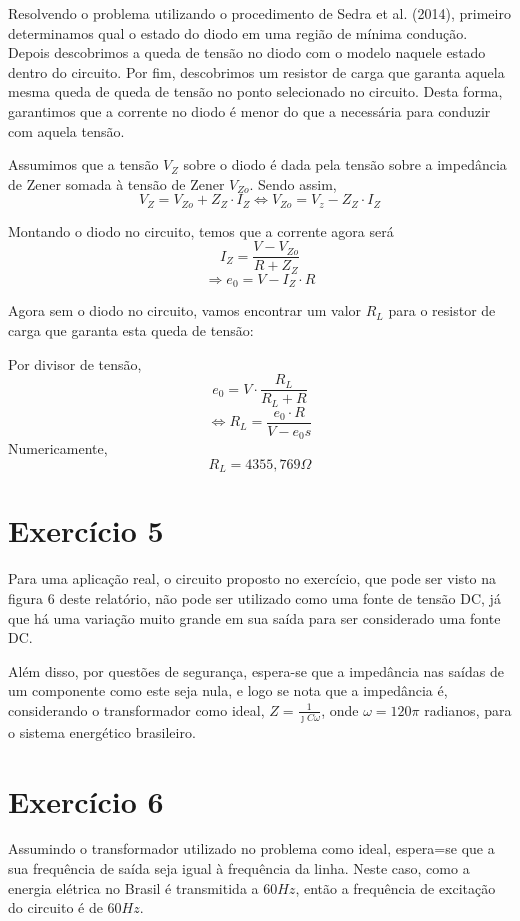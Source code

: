 \documentclass[12pt, a4paper, twoside]{article}
\begin{document}
Resolvendo o problema utilizando o procedimento de Sedra et al. (2014), primeiro determinamos qual o estado do diodo em uma região de mínima condução. Depois descobrimos a queda de tensão no diodo com o modelo naquele estado dentro do circuito. Por fim, descobrimos um resistor de carga que garanta aquela mesma queda de queda de tensão no ponto selecionado no circuito. Desta forma, garantimos que a corrente no diodo é menor do que a necessária para conduzir com aquela tensão.

Assumimos que a tensão $V_Z$ sobre o diodo é dada pela tensão sobre a impedância de Zener somada à tensão de Zener $V_{Zo}$. Sendo assim,
$$ V_Z = V_{Zo} + Z_Z \cdot I_Z \Leftrightarrow V_{Zo} = V_z - Z_Z \cdot I_Z $$


Montando o diodo no circuito, temos que a corrente agora será
$$ I_Z = \frac{V-V_{Zo}}{R+Z_Z} $$
$$ \Rightarrow e_0 = V - I_Z \cdot R $$

Agora sem o diodo no circuito, vamos encontrar um valor $R_L$ para o resistor de carga que garanta esta queda de tensão:


Por divisor de tensão,
$$ e_0 = V \cdot \frac{R_L}{R_L+R} $$
$$ \Leftrightarrow R_L = \frac{e_0 \cdot R}{V-e_0s} $$
Numericamente,
$$ R_L = 4355,769 \Omega $$

\section{Exercício 5}

Para uma aplicação real, o circuito proposto no exercício, que pode ser visto na figura 6 deste relatório, não pode ser utilizado como uma fonte de tensão DC, já que há uma variação muito grande em sua saída para ser considerado uma fonte DC.

Além disso, por questões de segurança, espera-se que a impedância nas saídas de um componente como este seja nula, e logo se nota que a impedância é, considerando o transformador como ideal, $Z = \frac{1}{\jmath C \omega}$, onde $\omega = 120 \pi$ radianos, para o sistema energético brasileiro.

\section{Exercício 6}

Assumindo o transformador utilizado no problema como ideal, espera=se que a sua frequência de saída seja igual à frequência da linha. Neste caso, como a energia elétrica no Brasil é transmitida a $60Hz$, então a frequência de excitação do circuito é de $60Hz$.
\end{document}
